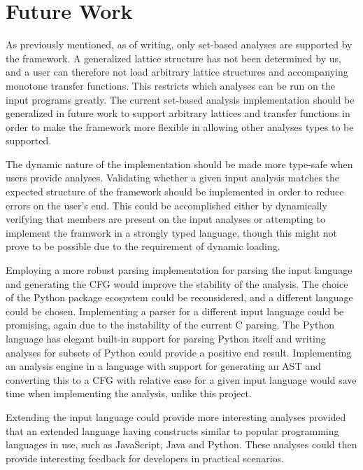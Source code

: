 \section{Future Work}
\label{futurework}

\newpar As previously mentioned, as of writing, only set-based analyses are supported by the framework. A generalized lattice structure has not been determined by us, and a user can therefore not load arbitrary lattice structures and accompanying monotone transfer functions. This restricts which analyses can be run on the input programs greatly. The current set-based analysis implementation should be generalized in future work to support arbitrary lattices and transfer functions in order to make the framework more flexible in allowing other analyses types to be supported. 

\newpar The dynamic nature of the implementation should be made more type-safe when users provide analyses. Validating whether a given input analysis matches the expected structure of the framework should be implemented in order to reduce errors on the user's end. This could be accomplished either by dynamically verifying that members are present on the input analyses or attempting to implement the framwork in a strongly typed language, though this might not prove to be possible due to the requirement of dynamic loading.

\newpar Employing a more robust parsing implementation for parsing the input language and generating the CFG would improve the stability of the analysis. The choice of the Python package ecosystem could be reconsidered, and a different language could be chosen. Implementing a parser for a different input language could be promising, again due to the instability of the current C parsing. The Python language has elegant built-in support for parsing Python itself and writing analyses for subsets of Python could provide a positive end result. Implementing an analysis engine in a language with support for generating an AST and converting this to a CFG with relative ease for a given input language would save time when implementing the analysis, unlike this project.

\newpar Extending the input language could provide more interesting analyses provided that an extended language having constructs similar to popular programming languages in use, such as JavaScript, Java and Python\cite{github:languages}. These analyses could then provide interesting feedback for developers in practical scenarios.